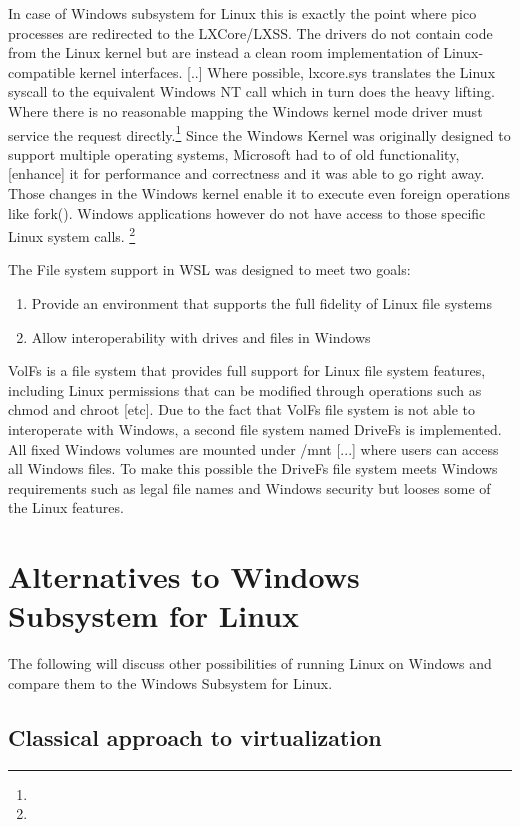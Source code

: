 \documentclass[utf8,biblatex, ngerman, english]{lni}
\begin{document}
In case of Windows subsystem for Linux this is exactly the point where pico processes are redirected to the LXCore/LXSS. \glqq The drivers do not contain code from the Linux kernel but are instead a clean room implementation of Linux-compatible kernel interfaces. [..] Where possible, lxcore.sys translates the Linux syscall to the equivalent Windows NT call which in turn does the heavy lifting. Where there is no reasonable mapping the Windows kernel mode driver must service the request directly.\glqq \footnote{} Since the Windows Kernel was originally designed to support multiple operating systems, Microsoft had to \glqq [dust] [...] of old functionality, [enhance] it for performance and correctness and it was able to go right away.\glqq \cite{PP16} Those changes in the Windows kernel enable it to execute even foreign operations like fork(). Windows applications however do not have access to those specific Linux system calls. \footnote{}

\glqq The File system support in WSL was designed to meet two goals:
\begin{enumerate}
    \item Provide an environment that supports the full fidelity of Linux file systems
    \item Allow interoperability with drives and files in Windows
\end{enumerate}\cite{WSL16}

\glqq VolFs is a file system that provides full support for Linux file system features, including Linux permissions that can be modified through operations such as chmod and chroot [etc].\glqq \cite{WSL16} Due to the fact that VolFs file system is not able to interoperate with Windows, a second file system named DriveFs is implemented. \glqq All fixed Windows volumes are mounted under /mnt [...] where users can access all Windows files.\glqq \cite{WSL16} To make this possible the DriveFs file system meets Windows requirements such as legal file names and Windows security but looses some of the Linux features.

\section{Alternatives to Windows Subsystem for Linux}
The following will discuss other possibilities of running Linux on Windows and compare them to the Windows Subsystem for Linux.

\subsection{Classical approach to virtualization}
\end{document}
